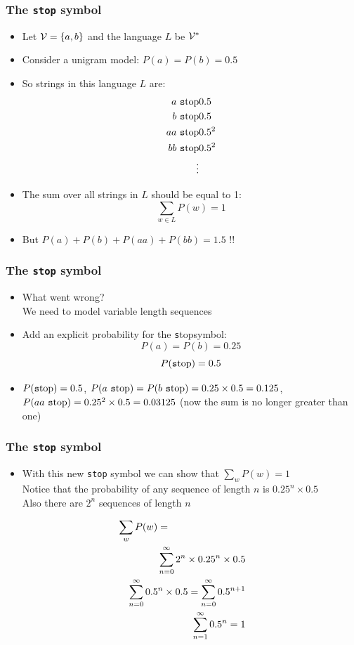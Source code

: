 \newcommand{\lmstop}{\mbox{\texttt stop}}

\begin{frame}
\frametitle{The {\tt stop} symbol}
\begin{itemize}[<+->]
\item Let ${\cal V} = \{ a, b \}$ and the language $L$ be ${\cal V}^\ast$
\item Consider a unigram model: $P(a) = P(b) = 0.5$
\item So strings in this language $L$ are:
\begin{eqnarray*}
a\ \lmstop & 0.5 \\
b\ \lmstop & 0.5 \\
aa\ \lmstop & 0.5^2 \\
bb\ \lmstop & 0.5^2 \\
\vdots
\end{eqnarray*}
\item The sum over all strings in $L$ should be equal to 1:
\[ \sum_{w \in L} P(w) = 1 \]
\item But $P(a) + P(b) + P(aa) + P(bb) = 1.5$ !! 
\end{itemize}
\end{frame}

\begin{frame}
\frametitle{The {\tt stop} symbol}
\begin{itemize}[<+->]
\item What went wrong? \\
We need to model variable length sequences
\item Add an explicit probability for the \lmstop symbol: 
\[ P(a) = P(b) = 0.25  \]
\[ P(\lmstop) = 0.5 \]
\item $P(\lmstop) = 0.5$, $P(a\ \lmstop) = P(b\ \lmstop) = 0.25 \times 0.5 = 0.125$, 
$P(aa\ \lmstop) = 0.25^2 \times 0.5 = 0.03125$ (now the sum is no longer greater than one)
\end{itemize}
\end{frame}

\begin{frame}
\frametitle{The {\tt stop} symbol}
\begin{itemize}[<+->]
\item With this new {\tt stop} symbol we can show that $\sum_w P(w) = 1$ \\
Notice that the probability of any sequence of length $n$ is $0.25^n \times 0.5$ \\
Also there are $2^n$ sequences of length $n$
\end{itemize}
\begin{eqnarray}
\lefteqn{\sum_w P(w) = } \nonumber \\
&& \sum_{n=0}^{\infty} 2^n \times 0.25^n \times 0.5 \nonumber \\
&& \sum_{n=0}^{\infty} 0.5^n \times 0.5 = \sum_{n=0}^{\infty} 0.5^{n+1} \nonumber \\
&& \sum_{n=1}^{\infty} 0.5^n = 1 \nonumber
\end{eqnarray}
\end{frame}

